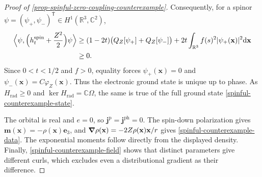 \documentclass[final,reqno]{amsart}
\theoremstyle{remark}
\newcommand{\RR}{\mathbb{R}}
\newcommand{\CC}{\mathbb{C}}
\newcommand{\vjp}{\mathbf{j}^{\mathrm{p}}}
\newcommand{\vjph}{\mathbf{j}^{\mathrm{ph}}}
\newcommand{\rad}{\mathrm{rad}}
\let\phi=\varphi
\newcommand{\ve}{\mathbf{e}}
\newcommand{\vm}{\mathbf{m}}
\newcommand{\vx}{\mathbf{x}}
\begin{document}
\begin{proof}[Proof of \cref{prop-spinful-zero-coupling-counterexample}]
Consequently, for a spinor
$\psi=(\psi_+,\psi_-)^{\mathsf T}\in H^1(\RR^3,\CC^2)$,
\begin{equation*}
 \begin{split}
 \Bigl\langle\psi,
       \Bigl(h_t^{\mathrm{spin}}+\frac{Z^2}{2}\Bigr)\psi\Bigr\rangle
 &\geq(1-2t)\bigl(Q_Z[\psi_+]+Q_Z[\psi_-]\bigr)
             +2t\int_{\RR^3}f(s)^2|\psi_+(\vx)|^2\dd\vx\\
 &\geq0.
 \end{split}
\end{equation*}
Since $0<t<1/2$ and $f>0$, equality forces $\psi_+(\vx)=0$ and
$\psi_-(\vx)=C\phi_Z(\vx)$.  Thus the electronic ground state is unique
up to phase.  As $H_\rad\geq0$ and
$\ker H_\rad=\CC\Omega$, the same is true of the full ground state
\cref{spinful-counterexample-state}.

The orbital is real and $e=0$, so $\vjp=\vjph=0$.
The spin-down polarization gives $\vm(\vx)=-\rho(\vx)\ve_3$, and
$\grad\rho(\vx)=-2Z\rho(\vx)\vx/r$ gives \cref{spinful-counterexample-data}.
The exponential moments follow directly from the displayed density.
Finally, \cref{spinful-counterexample-field} shows that distinct
parameters give different curls, which excludes even a
distributional gradient as their difference.
\end{proof}
\end{document}
